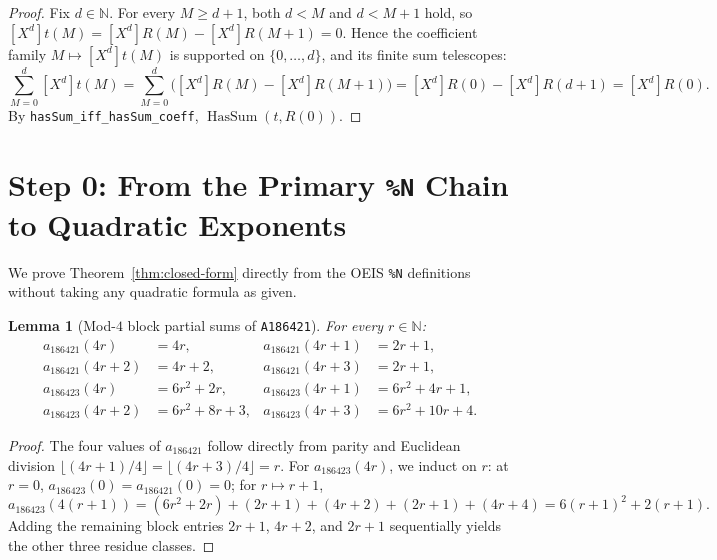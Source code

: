 \documentclass[11pt]{article}
\newtheorem{lemma}[theorem]{Lemma}
\theoremstyle{definition}
\newcommand{\N}{\mathbb{N}}
\newcommand{\seq}[1]{\texttt{#1}}
\begin{document}
\begin{proof}
Fix $d \in \N$. For every $M \ge d + 1$, both $d < M$ and $d < M + 1$ hold, so $[X^d] t(M) = [X^d] R(M) - [X^d] R(M + 1) = 0$. Hence the coefficient family $M \mapsto [X^d] t(M)$ is supported on $\{0, \dots, d\}$, and its finite sum telescopes:
\[
\sum_{M=0}^{d} [X^d] t(M) = \sum_{M=0}^{d} \bigl([X^d] R(M) - [X^d] R(M + 1)\bigr) = [X^d] R(0) - [X^d] R(d + 1) = [X^d] R(0).
\]
By \texttt{hasSum\_iff\_hasSum\_coeff}, $\operatorname{HasSum}(t, R(0))$.
\end{proof}

\section{Step 0: From the Primary \texttt{\%N} Chain to Quadratic Exponents}

We prove Theorem~\ref{thm:closed-form} directly from the OEIS \texttt{\%N} definitions without taking any quadratic formula as given.

\begin{lemma}[Mod-$4$ block partial sums of \seq{A186421}]
\label{lem:mod4}
For every $r \in \N$:
\begin{align*}
a_{186421}(4r) &= 4r, & a_{186421}(4r + 1) &= 2r + 1, \\
a_{186421}(4r + 2) &= 4r + 2, & a_{186421}(4r + 3) &= 2r + 1, \\[3pt]
a_{186423}(4r) &= 6r^2 + 2r, & a_{186423}(4r + 1) &= 6r^2 + 4r + 1, \\
a_{186423}(4r + 2) &= 6r^2 + 8r + 3, & a_{186423}(4r + 3) &= 6r^2 + 10r + 4.
\end{align*}
\end{lemma}

\begin{proof}
The four values of $a_{186421}$ follow directly from parity and Euclidean division $\lfloor (4r + 1)/4 \rfloor = \lfloor (4r + 3)/4 \rfloor = r$. For $a_{186423}(4r)$, we induct on $r$: at $r = 0$, $a_{186423}(0) = a_{186421}(0) = 0$; for $r \mapsto r + 1$,
\[
a_{186423}(4(r + 1)) = (6r^2 + 2r) + (2r + 1) + (4r + 2) + (2r + 1) + (4r + 4) = 6(r + 1)^2 + 2(r + 1).
\]
Adding the remaining block entries $2r + 1$, $4r + 2$, and $2r + 1$ sequentially yields the other three residue classes.
\end{proof}
\end{document}
